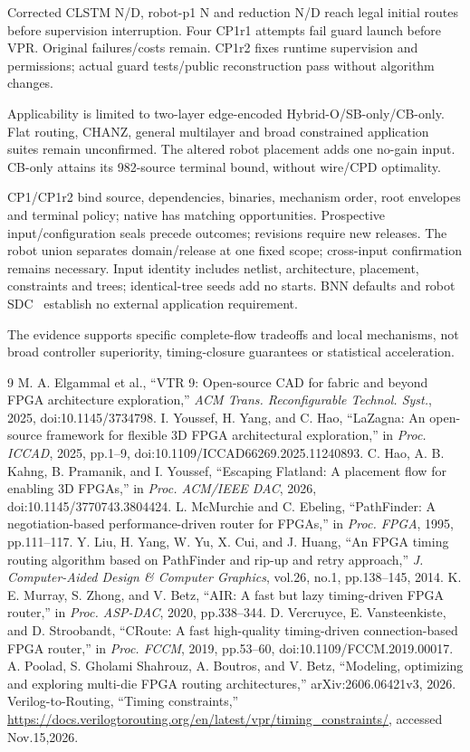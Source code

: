 \documentclass[conference,10pt]{IEEEtran}
\begin{document}
Corrected CLSTM N/D, robot-p1 N and reduction N/D reach legal initial routes before supervision interruption. Four CP1r1 attempts fail guard launch before VPR. Original failures/costs remain. CP1r2 fixes runtime supervision and permissions; actual guard tests/public reconstruction pass without algorithm changes.

Applicability is limited to two-layer edge-encoded Hybrid-O/SB-only/CB-only. Flat routing, CHANZ, general multilayer and broad constrained application suites remain unconfirmed. The altered robot placement adds one no-gain input. CB-only attains its 982-source terminal bound, without wire/CPD optimality.

CP1/CP1r2 bind source, dependencies, binaries, mechanism order, root envelopes and terminal policy; native has matching opportunities. Prospective input/configuration seals precede outcomes; revisions require new releases. The robot union separates domain/release at one fixed scope; cross-input confirmation remains necessary. Input identity includes netlist, architecture, placement, constraints and trees; identical-tree seeds add no starts. BNN defaults and robot SDC~\cite{vprsdc} establish no external application requirement.

The evidence supports specific complete-flow tradeoffs and local mechanisms, not broad controller superiority, timing-closure guarantees or statistical acceleration.
\begin{thebibliography}{9}
 M. A. Elgammal et al., ``VTR 9: Open-source CAD for fabric and beyond FPGA architecture exploration,'' \emph{ACM Trans. Reconfigurable Technol. Syst.}, 2025, doi:10.1145/3734798.
 I. Youssef, H. Yang, and C. Hao, ``LaZagna: An open-source framework for flexible 3D FPGA architectural exploration,'' in \emph{Proc. ICCAD}, 2025, pp.1--9, doi:10.1109/ICCAD66269.2025.11240893.
 C. Hao, A. B. Kahng, B. Pramanik, and I. Youssef, ``Escaping Flatland: A placement flow for enabling 3D FPGAs,'' in \emph{Proc. ACM/IEEE DAC}, 2026, doi:10.1145/3770743.3804424.
 L. McMurchie and C. Ebeling, ``PathFinder: A negotiation-based performance-driven router for FPGAs,'' in \emph{Proc. FPGA}, 1995, pp.111--117.
 Y. Liu, H. Yang, W. Yu, X. Cui, and J. Huang, ``An FPGA timing routing algorithm based on PathFinder and rip-up and retry approach,'' \emph{J. Computer-Aided Design \& Computer Graphics}, vol.26, no.1, pp.138--145, 2014.
 K. E. Murray, S. Zhong, and V. Betz, ``AIR: A fast but lazy timing-driven FPGA router,'' in \emph{Proc. ASP-DAC}, 2020, pp.338--344.
 D. Vercruyce, E. Vansteenkiste, and D. Stroobandt, ``CRoute: A fast high-quality timing-driven connection-based FPGA router,'' in \emph{Proc. FCCM}, 2019, pp.53--60, doi:10.1109/FCCM.2019.00017.
 A. Poolad, S. Gholami Shahrouz, A. Boutros, and V. Betz, ``Modeling, optimizing and exploring multi-die FPGA routing architectures,'' arXiv:2606.06421v3, 2026.
 Verilog-to-Routing, ``Timing constraints,'' \url{https://docs.verilogtorouting.org/en/latest/vpr/timing_constraints/}, accessed Nov.15,2026.
\end{thebibliography}
\end{document}
